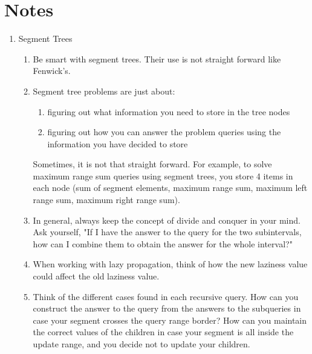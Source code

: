 \documentclass[12pt]{book}
\begin{document}
\section{Notes}
\begin{enumerate}
\item Segment Trees
\begin{enumerate}
\item Be smart with segment trees. Their use is not straight forward like Fenwick's.
\item Segment tree problems are just about:
\begin{enumerate}
\item figuring out what information you need to store in the tree nodes
\item figuring out how you can answer the problem queries using the information you have decided to store
\end{enumerate}
Sometimes, it is not that straight forward. For example, to solve maximum range sum queries using segment trees, you store 4 items in each node (sum of segment elements, maximum range sum, maximum left range sum, maximum right range sum).
\item In general, always keep the concept of divide and conquer in your mind. Ask yourself, "If I have the answer to the query for the two subintervals, how can I combine them to obtain the answer for the whole interval?"
\item When working with lazy propagation, think of how the new laziness value could affect the old laziness value.
\item Think of the different cases found in each recursive query. How can you construct the answer to the query from the answers to the subqueries in case your segment crosses the query range border? How can you maintain the correct values of the children in case your segment is all inside the update range, and you decide not to update your children.
\end{enumerate}



\end{enumerate}
\end{document}
